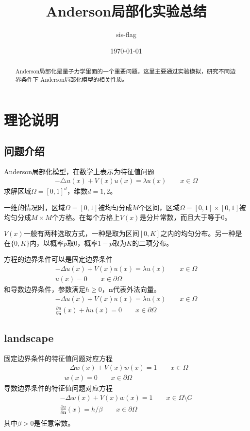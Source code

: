 \documentclass[12pt,a4paper]{article}
\title{Anderson局部化实验总结}
\author{sis-flag}
\date{\today}
\begin{document}
\maketitle

\begin{abstract}
Anderson局部化是量子力学里面的一个重要问题。这里主要通过实验模拟，研究不同边界条件下 Anderson局部化模型的相关性质。
\end{abstract}

\section{理论说明}

\subsection{问题介绍}

Anderson局部化模型，在数学上表示为特征值问题
\begin{align}
- \triangle u(x) + V(x) u(x) = \lambda u(x) \qquad x \in \Omega
\end{align}
求解区域$\Omega = [0,1]^d$，维数$d = 1, 2$。

一维的情况时，区域$\Omega=[0,1]$被均匀分成$M$个区间，区域$\Omega=[0,1] \times [0,1]$被均匀分成$M \times M$个方格。在每个方格上$V(x)$是分片常数，而且大于等于0。

$V(x)$一般有两种选取方式，一种是取为区间$[0, K]$之内的均匀分布。另一种是在$\{0, K\}$内，以概率$p$取$0$，概率$1-p$取为$K$的二项分布。

方程的边界条件可以是固定边界条件
\begin{align}
- \Delta u(x) + V(x) u(x) = \lambda u(x) \qquad x \in \Omega \\
u(x) = 0 \qquad x \in \partial \Omega
\end{align}
和导数边界条件，参数满足$h \geq 0$，$\mathbf{n}$代表外法向量。
\begin{align}
- \Delta u(x) + V(x) u(x) = \lambda u(x) \qquad x \in \Omega \\
\frac{\partial u}{\partial \mathbf{n}}(x) + h u(x) = 0 \qquad x \in \partial \Omega
\end{align}

\subsection{landscape}

固定边界条件的特征值问题对应方程
\begin{align}
- \Delta w(x) + V(x) w(x) = 1 \qquad x \in \Omega \\
w(x) = 0 \qquad x \in \partial \Omega
\end{align}
导数边界条件的特征值问题对应方程
\begin{align}
- \Delta w(x) + V(x) w(x) = 1 \qquad x \in \Omega \setminus G \\
\frac{\partial u}{\partial \mathbf{n}}(x) = h / \beta \qquad x \in \partial \Omega \\
\end{align}
其中$\beta > 0$是任意常数。
\end{document}
